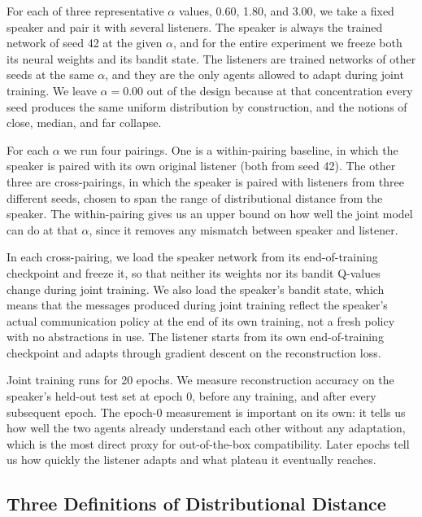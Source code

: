 For each of three representative $\alpha$ values, 0.60, 1.80, and 3.00, we take a fixed speaker and pair it with several listeners. The speaker is always the trained network of seed 42 at the given $\alpha$, and for the entire experiment we freeze both its neural weights and its bandit state. The listeners are trained networks of other seeds at the same $\alpha$, and they are the only agents allowed to adapt during joint training. We leave $\alpha = 0.00$ out of the design because at that concentration every seed produces the same uniform distribution by construction, and the notions of close, median, and far collapse.

For each $\alpha$ we run four pairings. One is a within-pairing baseline, in which the speaker is paired with its own original listener (both from seed 42). The other three are cross-pairings, in which the speaker is paired with listeners from three different seeds, chosen to span the range of distributional distance from the speaker. The within-pairing gives us an upper bound on how well the joint model can do at that $\alpha$, since it removes any mismatch between speaker and listener.

In each cross-pairing, we load the speaker network from its end-of-training checkpoint and freeze it, so that neither its weights nor its bandit Q-values change during joint training. We also load the speaker's bandit state, which means that the messages produced during joint training reflect the speaker's actual communication policy at the end of its own training, not a fresh policy with no abstractions in use. The listener starts from its own end-of-training checkpoint and adapts through gradient descent on the reconstruction loss.

Joint training runs for 20 epochs. We measure reconstruction accuracy on the speaker's held-out test set at epoch 0, before any training, and after every subsequent epoch. The epoch-0 measurement is important on its own: it tells us how well the two agents already understand each other without any adaptation, which is the most direct proxy for out-of-the-box compatibility. Later epochs tell us how quickly the listener adapts and what plateau it eventually reaches.

\subsection{Three Definitions of Distributional Distance}
\label{sec:rq3-distance-metrics}

